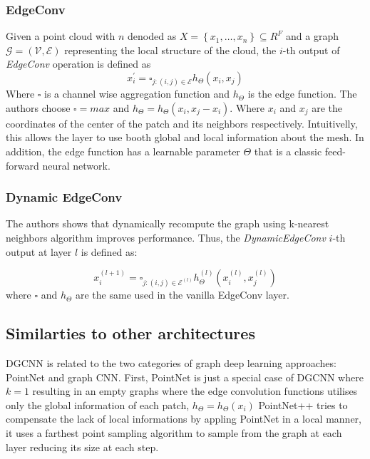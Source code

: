 \documentclass[twocolumn,showpacs,
  nofootinbib,aps,superscriptaddress,
  eqsecnum,prd,notitlepage,showkeys,10pt]{revtex4-1}
\begin{document}
\subsubsection{EdgeConv}
Given a point cloud with $n$ denoded as $X=\left\{x_{1}, \ldots, x_{n}\right\} \subseteq R^{F}$ and a graph $\mathcal{G}=(\mathcal{V}, \mathcal{E})$ representing the local structure of the cloud, the $i$-th output of \emph{EdgeConv} operation is defined as
\begin{equation}
  x_{i}^{\prime}=\square_{j :(i, j) \in \mathcal{E}} h_{\Theta}\left(x_{i}, x_{j}\right)
  \end{equation}
Where $\square$ is a channel wise aggregation function and $h_{\Theta}$ is the edge function. The authors choose $\square=max$ and $h_{\Theta} = h_{\Theta}(x_i, x_j - x_i)$. Where $x_i$ and $x_j$ are the coordinates of the center of the patch and its neighbors respectively. Intuitivelly, this allows the layer to use booth global and local information about the mesh. In addition, the edge function has a learnable parameter $\Theta$ that is a classic feed-forward neural network. 
\subsubsection{Dynamic EdgeConv}
The authors shows that dynamically recompute the graph using k-nearest neighbors algorithm improves performance. Thus, the \emph{DynamicEdgeConv} $i$-th output at layer $l$ is defined as:

\begin{equation}
  x_{i}^{(l+1)}=\square_{j :(i, j) \in \mathcal{E}^{(l)}} h_{\Theta}^{(l)}\left(x_{i}^{(l)}, x_{j}^{(l)}\right)
\end{equation}
where $\square$ and $h_{\Theta}$ are the same used in the vanilla EdgeConv layer.
\subsection{Similarties to other architectures}


DGCNN is related to the two categories of graph deep learning  approaches: PointNet and graph CNN.
First, PointNet is just a special case of DGCNN where $k=1$ resulting in an empty graphs where the edge convolution functions utilises only the global information of each patch, $h_{\Theta} = h_{\Theta}(x_i)$
PointNet++ \cite{pointnet_plus} tries to compensate the lack of local informations by appling PointNet in a local manner, it uses a farthest point sampling algorithm to sample from the graph at each layer reducing its size at each step.
\end{document}
